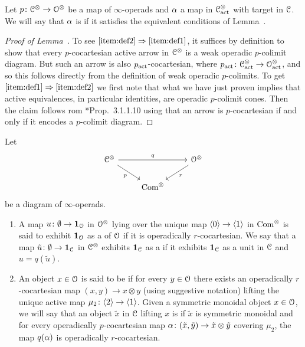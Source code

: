 \begin{definition}
\label{definition:operadically-cocartesian}%
Let $p\colon \mathcal C^{\otimes} \to \mathcal{O}^{\otimes}$ be a map of $\infty$-operads and $\alpha$ a map in $\mathcal C^{\otimes}_{\mathrm{act}}$ with target in $\mathcal C$. We will say that $\alpha$ is  if it satisfies the equivalent conditions of Lemma~.
\end{definition}

\begin{proof}[Proof of Lemma~]
To see $\reffouritem{item:def2} \Rightarrow \reffouritem{item:def1}$, it suffices by definition to show that every $p$-cocartesian active arrow in $\mathcal C^{\otimes}$
is a weak operadic $p$-colimit diagram.
But such an arrow is also $p_{\mathrm{act}}$-cocartesian, where $p_{\mathrm{act}}\colon \mathcal C_{\mathrm{act}}^\otimes \to \mathcal{O}_{\mathrm{act}}^\otimes$, and so this follows directly from the definition of weak operadic $p$-colimits.
To get $\reffouritem{item:def1} \Rightarrow \reffouritem{item:def2}$ we first note that what we have just proven implies that active equivalences, in particular identities, are operadic $p$-colimit cones. Then the claim follows rom \cite{HA}*{Prop.\ 3.1.1.10} using that an arrow is $p$-cocartesian if and only if it encodes a $p$-colimit diagram.
\end{proof}


\begin{definition}
\label{definition:monoidal-and-unit}%
Let 
\[
\begin{tikzcd}
\C^{\otimes} \ar[dr,"p"']\ar[rr,"q"] && \cO^{\otimes} \ar[dl,"r"] \\
& \Com^{\otimes} &
\end{tikzcd}
\]
be a diagram of $\infty$-operads.
\begin{enumerate}
\item 
A map $u\colon \emptyset \to \mathbf{1}_{\mathcal{O}}$ in $\mathcal{O}^\otimes$ lying over the unique map $\langle0\rangle \to \langle1\rangle$ in $\mathrm{Com}^{\otimes}$ is said to exhibit $\mathbf{1}_{\mathcal{O}}$ as a  of $\mathcal{O}$ if it is operadically $r$-cocartesian. We say that a map $\tilde{u}\colon \emptyset \to \mathbf{1}_\mathcal C$ in $\mathcal C^{\otimes}$ exhibits $\mathbf{1}_\mathcal C$ as a  if it exhibits $\mathbf{1}_\mathcal C$ as a unit in $\mathcal C$ and $u=q(\tilde{u})$.
\item
An object $x \in \mathcal{O}$ is said to be  if for every $y \in \mathcal{O}$ there exists an operadically $r$-cocartesian map $(x,y) \to x\otimes y$ (using suggestive notation) lifting the unique active map $\mu_2\colon \langle2\rangle \to \langle1\rangle$.
Given a symmetric monoidal object $x \in \mathcal{O}$, we will say that an object $\tilde{x}$ in $\mathcal C$ lifting $x$ is  if $\tilde{x}$ is symmetric monoidal %
and for every operadically $p$-cocartesian map %
$\alpha\colon (\tilde{x},\tilde{y}) \to \tilde{x}\otimes\tilde{y}$ %
covering $\mu_2$, the map $q(\alpha)$ is operadically $r$-cocartesian. 
\end{enumerate}
\end{definition}


